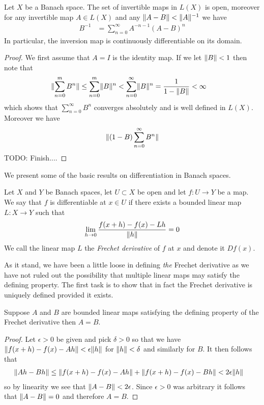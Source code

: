 \begin{prop}Let $X$ be a Banach space.  The set of invertible maps in $L(X)$ is open, moreover
  for any invertible map $A \in L(X)$ and any $\lVert A-B \rVert <
  \lVert A \rVert^{-1}$ we have 
\begin{align*}
B^{-1} &= \sum_{n=0}^\infty A^{-n-1} (A-B)^n 
\end{align*}
In particular, the inversion map is continuously differentiable on its domain.
\end{prop}
\begin{proof}
We first assume that $A= I$ is the identity map.  If we let $\lVert B \rVert
< 1$ then note that 
\begin{align*}
\lVert \sum_{n=0}^m B^n \rVert &\leq \sum_{n=0}^m \lVert  B \rVert^n <
                          \sum_{n=0}^\infty \lVert  B \rVert^n =
                          \frac{1}{1-\lVert B \rVert} < \infty
\end{align*}
which shows that $\sum_{n=0}^\infty B^n$ converges absolutely and
is well defined in $L(X)$.  Moreover we have
\begin{align*}
\lVert (1- B) \sum_{n=0}^\infty B^n  \rVert
\end{align*}
TODO: Finish....
\end{proof}

We present some of the basic results on differentiation in Banach
spaces.

\begin{defn}Let $X$ and $Y$ be Banach spaces, let $U \subset X$ be
  open and let $f : U \to Y$ be
  a map.  We say that $f$ is differentiable at $x \in U$ if there
  exists a bounded linear map $L : X \to Y$ such that
\begin{align*}
\lim_{h \to 0} \frac{f(x + h) - f(x) -Lh}{\lVert h \rVert} = 0
\end{align*}
We call the linear map $L$ the \emph{Frechet derivative} of $f$ at $x$
and denote it $Df(x)$.
\end{defn}

As it stand, we have been a little loose in defining \emph{the}
Frechet derivative as we have not ruled out the possibility that
multiple linear maps may satisfy the defining property.   The first
task is to show that in fact the Frechet derivative is uniquely
defined provided it exists.

\begin{prop}Suppose $A$ and $B$ are bounded linear maps satisfying the
  defining property of the Frechet derivative then $A = B$.
\end{prop}
\begin{proof}
Let $\epsilon > 0$ be given and pick $\delta > 0$ so that we have
$\lVert f(x+h) - f(x) -Ah \rVert < \epsilon \lVert h \rVert$ for $\lVert h \rVert < \delta$
and similarly for $B$.  It then follows that
\begin{align*}
\lVert Ah - Bh \rVert &\leq \lVert f(x+h) - f(x) -Ah \rVert + \lVert f(x+h) - f(x)
                 -Bh \rVert < 2 \epsilon \lVert h \rVert
\end{align*}
so by linearity we see that $\lVert A - B \rVert < 2 \epsilon$.  Since
$\epsilon>0$ was arbitrary it follows that $\lVert A -B \rVert = 0$ and
therefore $A = B$.
\end{proof}

